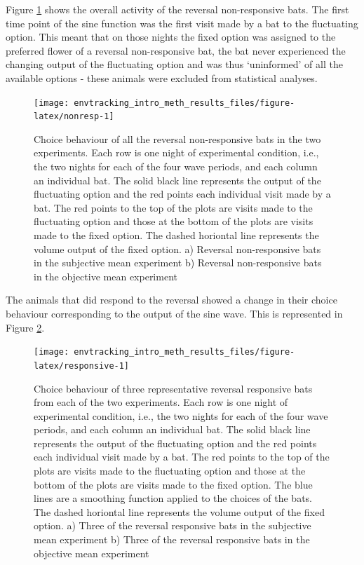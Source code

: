 \documentclass[
]{article}
\begin{document}
Figure \ref{fig:nonresp} shows the overall activity of the reversal non-responsive bats. The first time point of the sine function was the first visit made by a bat to the fluctuating option. This meant that on those nights the fixed option was assigned to the preferred flower of a reversal non-responsive bat, the bat never experienced the changing output of the fluctuating option and was thus `uninformed' of all the available options - these animals were excluded from statistical analyses.



\begin{figure}[H]

{\centering \texttt{[image: envtracking\_intro\_meth\_results\_files/figure-latex/nonresp-1]} 

}

\caption{Choice behaviour of all the reversal non-responsive bats in the two experiments. Each row is one night of experimental condition, i.e., the two nights for each of the four wave periods, and each column an individual bat. The solid black line represents the output of the fluctuating option and the red points each individual visit made by a bat. The red points to the top of the plots are visits made to the fluctuating option and those at the bottom of the plots are visits made to the fixed option. The dashed horiontal line represents the volume output of the fixed option. a) Reversal non-responsive bats in the subjective mean experiment b) Reversal non-responsive bats in the objective mean experiment}\label{fig:nonresp}
\end{figure}

The animals that did respond to the reversal showed a change in their choice behaviour corresponding to the output of the sine wave. This is represented in Figure \ref{fig:responsive}.



\begin{figure}[H]

{\centering \texttt{[image: envtracking\_intro\_meth\_results\_files/figure-latex/responsive-1]} 

}

\caption{Choice behaviour of three representative reversal responsive bats from each of the two experiments. Each row is one night of experimental condition, i.e., the two nights for each of the four wave periods, and each column an individual bat. The solid black line represents the output of the fluctuating option and the red points each individual visit made by a bat. The red points to the top of the plots are visits made to the fluctuating option and those at the bottom of the plots are visits made to the fixed option. The blue lines are a smoothing function applied to the choices of the bats. The dashed horiontal line represents the volume output of the fixed option. a) Three of the reversal responsive bats in the subjective mean experiment b) Three of the reversal responsive bats in the objective mean experiment}\label{fig:responsive}
\end{figure}
\end{document}
